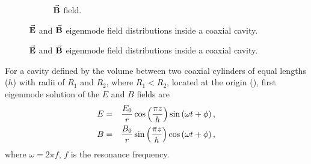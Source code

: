 \documentclass[a4paper,oneside,12pt]{report}
\numberwithin{equation}{chapter}
\begin{document}
\begin{figure}[H]
\begin{subfigure}{0.45\textwidth}
        \caption*{$\vec{\textbf{B}}$ field.}
    \end{subfigure}
    \caption{$\vec{\textbf{E}}$ and $\vec{\textbf{B}}$ eigenmode field distributions inside a coaxial cavity.}
    \label{fig:rhodo_cavity_field_dist}
\end{figure} \fi
\begin{figure}[H]
    \centering
    \qquad{}%
    \vspace{20pt}
    \caption{$\vec{\textbf{E}}$ and $\vec{\textbf{B}}$ eigenmode field distributions inside a coaxial cavity.}
    \label{fig:rhodo_cavity_field_dist}
\end{figure}
For a cavity defined by the volume between two coaxial cylinders of equal lengths ($h$) with radii of $R_1$ and $R_2$, where $R_1 < R_2$, located at the origin (),
first eigenmode solution of the $E$ and $B$ fields are \cite{rhodo_pottier}
\vspace{-10pt}\begin{eqnarray}
    E &=& \frac{E_0}{r} \cos\left( \frac{\pi z}{h} \right) \sin \left( \omega t + \phi \right)  , \\
    B &=& \frac{B_0}{r} \sin\left( \frac{\pi z}{h}\right) \cos\left( \omega t + \phi\right)  ,
\vspace{-10pt}\end{eqnarray}
where $\omega=2\pi f$, $f$ is the resonance frequency.
\end{document}

